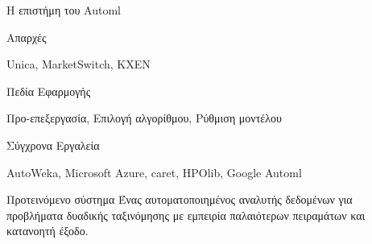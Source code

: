 \documentclass{beamer}
\begin{document}
  \begin{frame}{Η επιστήμη του Automl}
  	\begin{minipage}[t]{.4\textwidth}  		
  		Απαρχές
  		\vspace{4ex}
  	\end{minipage}%
  	  	\begin{minipage}[t]{.5\textwidth}
  	  		Unica, MarketSwitch, KXEN  	
  	  		\vspace{4ex}
  	  	\end{minipage}
  	\begin{minipage}[t]{.4\textwidth}  		
  		Πεδία Εφαρμογής
  		\vspace{4ex}
  	\end{minipage}%
  	\begin{minipage}[t]{.5\textwidth}
  		Προ-επεξεργασία, Επιλογή αλγορίθμου, Ρύθμιση μοντέλου
  		\vspace{4ex} 
  	\end{minipage}
  	\begin{minipage}[t]{.4\textwidth}  		
  		Σύγχρονα Εργαλεία
  		\vspace{4ex}
  	\end{minipage}%
	\begin{minipage}[t]{.5\textwidth}
  		AutoWeka, Microsoft Azure, caret, HPOlib, Google Automl
  		\vspace{4ex}
  	\end{minipage}
  \end{frame}
  
  \begin{frame} {Προτεινόμενο σύστημα}
  	Ένας \alert{αυτοματοποιημένος} αναλυτής δεδομένων για προβλήματα δυαδικής ταξινόμησης με \alert{εμπειρία} παλαιότερων πειραμάτων και \alert{κατανοητή} έξοδο.
  	
  \end{frame}
\end{document}
